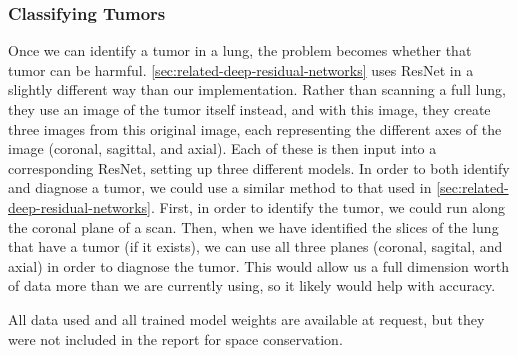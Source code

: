 \documentclass[10pt,twocolumn,letterpaper]{article}
\begin{document}
      \subsubsection{Classifying Tumors} \label{sec:classify-tumor}
    
         Once we can identify a tumor in a lung, the problem becomes whether that tumor can be harmful. \ref{sec:related-deep-residual-networks} uses ResNet in a slightly different way than our implementation. Rather than scanning a full lung, they use an image of the tumor itself instead, and with this image, they create three images from this original image, each representing the different axes of the image (coronal, sagittal, and axial). Each of these is then input into a corresponding ResNet, setting up three different models. In order to both identify and diagnose a tumor, we could use a similar method to that used in \ref{sec:related-deep-residual-networks}. First, in order to identify the tumor, we could run along the coronal plane of a scan. Then, when we have identified the slices of the lung that have a tumor (if it exists), we can use all three planes (coronal, sagital, and axial) in order to diagnose the tumor. This would allow us a full dimension worth of data more than we are currently using, so it likely would help with accuracy. 


  All data used and all trained model weights are available at request, but they were not included in the report for space conservation.


{\small



}
\end{document}
